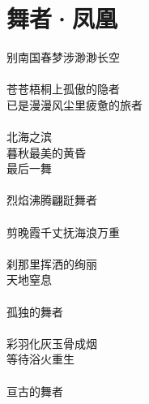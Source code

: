 \chapter{舞者·凤凰}

\leftskip=30mm
\noindent
别南国春梦\fspace 涉渺渺长空\\
\\
苍苍梧桐上孤傲的隐者\\
已是漫漫风尘里疲惫的旅者\\
\\
北海之滨\\
暮秋最美的黄昏\\
最后一舞\\
\\
烈焰沸腾\fspace 翩跹舞者\\
\\
剪晚霞千丈\fspace 抚海浪万重\\
\\
刹那里挥洒的绚丽\\
天地窒息\\
\\
孤独的舞者\\
\\
彩羽化灰\fspace 玉骨成烟\\
等待浴火重生\\
\\
亘古的舞者
